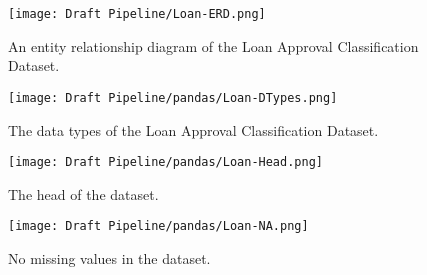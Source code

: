 \begin{figure}[H]
    \centering
    \texttt{[image: Draft Pipeline/Loan-ERD.png]}
    \caption{An entity relationship diagram of the Loan Approval Classification Dataset.}
    \label{fig:Loan-ERD}
\end{figure}

\begin{figure}[H]
    \centering
    \texttt{[image: Draft Pipeline/pandas/Loan-DTypes.png]}
    \caption{The data types of the Loan Approval Classification Dataset.}
    \label{fig:Loan-DTypes}
\end{figure}

\begin{figure}[H]
    \centering
    \texttt{[image: Draft Pipeline/pandas/Loan-Head.png]}
    \caption{The head of the dataset.}
    \label{fig:Loan-Head}
\end{figure}

\begin{figure}[H]
    \centering
    \texttt{[image: Draft Pipeline/pandas/Loan-NA.png]}
    \caption{No missing values in the dataset.}
    \label{fig:Loan-NAs}
\end{figure}


